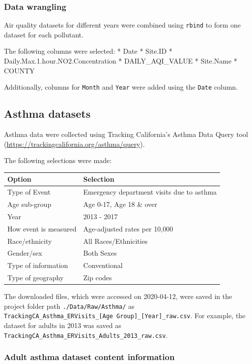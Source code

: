 \documentclass[12pt,]{article}
\begin{document}
\hypertarget{data-wrangling}{%
\subsubsection{Data wrangling}\label{data-wrangling}}

Air quality datasets for different years were combined using
\texttt{rbind} to form one dataset for each pollutant.

The following columns were selected: * Date * Site.ID *
Daily.Max.1.hour.NO2.Concentration * DAILY\_AQI\_VALUE * Site.Name *
COUNTY

Additionally, columns for \texttt{Month} and \texttt{Year} were added
using the \texttt{Date} column.

\hypertarget{asthma-datasets}{%
\subsection{Asthma datasets}\label{asthma-datasets}}

Asthma data were collected using Tracking California's Asthma Data Query
tool (\url{https://trackingcalifornia.org/asthma/query}).

The following selections were made:

\begin{longtable}[]{@{}ll@{}}
\toprule
Option & Selection\tabularnewline
\midrule
\endhead
Type of Event & Emergency department visits due to asthma\tabularnewline
Age sub-group & Age 0-17, Age 18 \& over\tabularnewline
Year & 2013 - 2017\tabularnewline
How event is measured & Age-adjusted rates per 10,000\tabularnewline
Race/ethnicity & All Races/Ethnicities\tabularnewline
Gender/sex & Both Sexes\tabularnewline
Type of information & Conventional\tabularnewline
Type of geography & Zip codes\tabularnewline
\bottomrule
\end{longtable}

The downloaded files, which were accessed on 2020-04-12, were saved in
the project folder path \texttt{./Data/Raw/Asthma/} as
\texttt{TrackingCA\_Asthma\_ERVisits\_{[}Age\ Group{]}\_{[}Year{]}\_raw.csv}.
For example, the dataset for adults in 2013 was saved as
\texttt{TrackingCA\_Asthma\_ERVisits\_Adults\_2013\_raw.csv}.

\hypertarget{adult-asthma-dataset-content-information}{%
\subsubsection{Adult asthma dataset content
information}\label{adult-asthma-dataset-content-information}}
\end{document}

